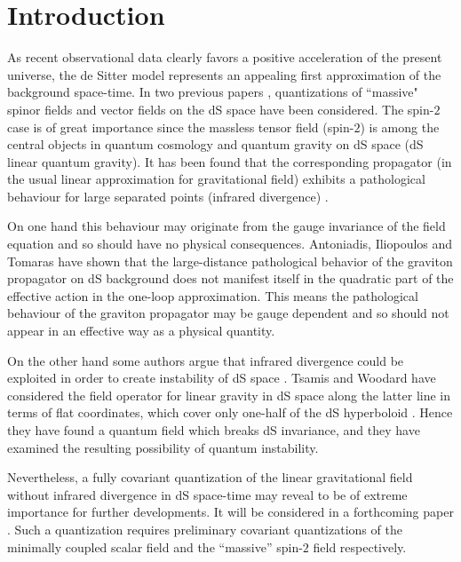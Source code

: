\documentclass[a4paper,11pt,showpacs,preprintnumbers]{revtex4}
\begin{document}
\section{Introduction}

As recent observational data clearly favors a positive
acceleration of the present universe, the de Sitter model
represents an appealing first approximation of the background
space-time. In two previous papers \cite{gata,bagamota},
quantizations of  ``massive" spinor fields and  vector fields on
the dS space have been considered. The spin-$2$ case is of great
importance since the massless tensor field (spin-$2$) is among the
central objects in quantum cosmology and quantum gravity on dS
space (dS linear quantum gravity). It has been found that the
corresponding propagator (in the usual linear approximation for
gravitational field)  exhibits a pathological behaviour for large
separated points (infrared divergence) \cite{altu, flilto,anmo1}.

On one hand this behaviour may originate from the gauge invariance
of the field equation and so should have no physical consequences.
Antoniadis, Iliopoulos and Tomaras \cite{anilto2} have shown that
the large-distance pathological behavior of the graviton
propagator on dS background does not manifest itself in the
quadratic part of the effective action in the one-loop
approximation. This means the pathological behaviour of the
graviton propagator may be gauge dependent and so should not
appear in an effective way as a physical quantity.

On the other hand some authors argue that infrared divergence
could be exploited in order to create instability of dS space
\cite{for, anilto1}. Tsamis and Woodard have considered the field
operator for linear gravity in dS space along the latter line in
terms of flat coordinates, which cover only one-half of the dS
hyperboloid \cite{tswo}. Hence they have found a quantum field
which breaks dS invariance, and  they have examined the resulting
possibility of quantum instability.

Nevertheless, a fully covariant quantization of the linear
gravitational field without infrared divergence in dS space-time
may reveal to be of extreme importance for further developments.
It will be considered in a forthcoming paper \cite{gareta2}. Such
a quantization requires preliminary covariant quantizations of the
minimally coupled scalar field and the ``massive'' spin-$2$ field
respectively.
\end{document}

